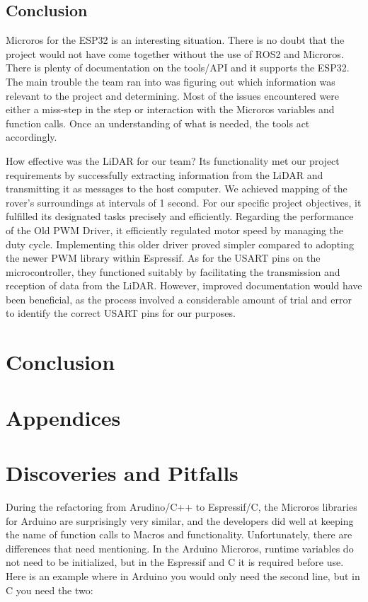 \documentclass[conference]{IEEEtran}
\begin{document}
\subsection{Conclusion}

Microros for the ESP32 is an interesting situation. There is no doubt that the project would not have come together without the use of ROS2 and Microros. There is plenty of documentation on the tools/API and it supports the ESP32. The main trouble the team ran into was figuring out which information was relevant to the project and determining. Most of the issues encountered were either a miss-step in the step or interaction with the Microros variables and function calls. Once an understanding of what is needed, the tools act accordingly.

How effective was the LiDAR for our team? Its functionality met our project requirements by successfully extracting information from the LiDAR and transmitting it as messages to the host computer. We achieved mapping of the rover's surroundings at intervals of 1 second. For our specific project objectives, it fulfilled its designated tasks precisely and efficiently.
Regarding the performance of the Old PWM Driver, it efficiently regulated motor speed by managing the duty cycle. Implementing this older driver proved simpler compared to adopting the newer PWM library within Espressif.
As for the USART pins on the microcontroller, they functioned suitably by facilitating the transmission and reception of data from the LiDAR. However, improved documentation would have been beneficial, as the process involved a considerable amount of trial and error to identify the correct USART pins for our purposes.


\section{Conclusion}

\section{Appendices}

\section{Discoveries and Pitfalls}  
During the refactoring from Arudino/C++ to Espressif/C, the Microros libraries for Arduino are surprisingly very similar, and the developers did well at keeping the name of function calls to Macros and functionality. Unfortunately, there are differences that need mentioning. In the Arduino Microros, runtime variables do not need to be initialized, but in the Espressif and C it is required before use. Here is an example where in Arduino you would only need the second line, but in C you need the two:
\end{document}
